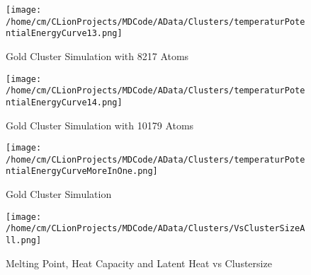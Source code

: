 \begin{figure}[!h] 
    \begin{center} 
        \texttt{[image: /home/cm/CLionProjects/MDCode/AData/Clusters/temperaturPotentialEnergyCurve13.png]} 
    \end{center} 
    \caption[Gold Cluster Simulation with 8217 Atoms]{Gold Cluster Simulation with 8217 Atoms} 
    \label{GoldClusterSimulationTemperaturEnergy8217} 
\end{figure} 
 
\begin{figure}[!h] 
    \begin{center} 
        \texttt{[image: /home/cm/CLionProjects/MDCode/AData/Clusters/temperaturPotentialEnergyCurve14.png]} 
    \end{center} 
    \caption[Gold Cluster Simulation with 10179 Atoms]{Gold Cluster Simulation with 10179 Atoms} 
    \label{GoldClusterSimulationTemperaturEnergy10179} 
\end{figure} 
 
\begin{figure}[!h] 
    \begin{center} 
        \texttt{[image: /home/cm/CLionProjects/MDCode/AData/Clusters/temperaturPotentialEnergyCurveMoreInOne.png]} 
    \end{center} 
    \caption[Gold Cluster Simulation]{Gold Cluster Simulation} 
    \label{GoldClusterSimulationTemperaturEnergy4In1} 
\end{figure} 
 
\begin{figure}[!h] 
    \begin{center} 
        \texttt{[image: /home/cm/CLionProjects/MDCode/AData/Clusters/VsClusterSizeAll.png]} 
    \end{center} 
    \caption[Melting Point, Heat Capacity and Latent Heat vs Clustersize]{Melting Point, Heat Capacity and Latent Heat vs Clustersize} 
    \label{GoldClusterSimulationVsClustersize} 
\end{figure} 
 

